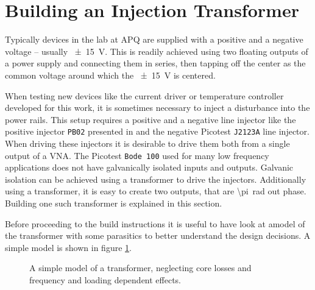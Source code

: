 \documentclass[12pt]{book}
\providecommand{\device}[1]{\texttt{\small #1}}
\begin{document}
\section{Building an Injection Transformer}
\label{sec:injection_transformer}
Typically devices in the lab at APQ are supplied with a positive and a negative voltage -- usually \qty{\pm 15}{\V}. This is readily achieved using two floating outputs of a power supply and connecting them in series, then tapping off the center as the common voltage around which the \qty{\pm 15}{\V} is centered.

When testing new devices like the current driver or temperature controller developed for this work, it is sometimes necessary to inject a disturbance into the power rails. This setup requires a positive and a negative line injector like the positive injector \device{PB02} presented in \cite{line_injector_github} and the negative Picotest \device{J2123A} line injector. When driving these injectors it is desirable to drive them both from a single output of a VNA. The Picotest \device{Bode 100} used for many low frequency applications does not have galvanically isolated inputs and outputs. Galvanic isolation can be achieved using a transformer to drive the injectors. Additionally using a transformer, it is easy to create two outputs, that are \qty{\pi}{\radian} out phase. Building one such transformer is explained in this section.

Before proceeding to the build instructions it is useful to have look at amodel of the transformer with some parasitics to better understand the design decisions. A simple model is shown in figure \ref{fig:transformer_model}.

\begin{figure}[ht]
    \centering
    \caption{A simple model of a transformer, neglecting core losses and frequency and loading dependent effects.}
    \label{fig:transformer_model}
\end{figure}
\end{document}
